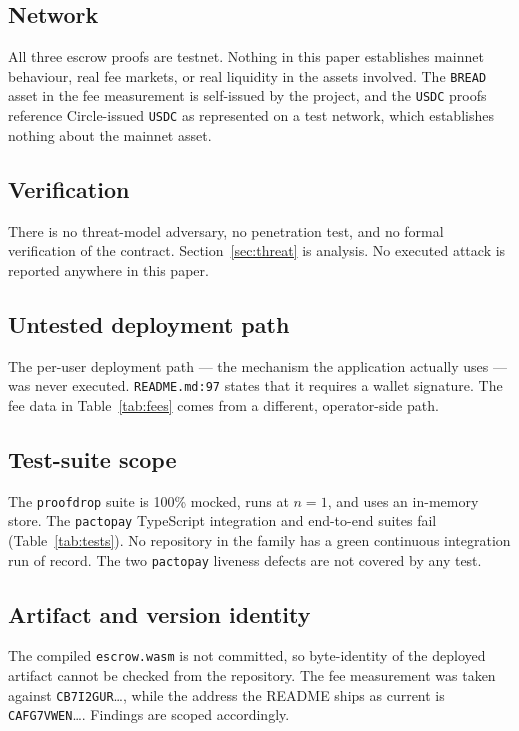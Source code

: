 \documentclass[sigconf,review]{acmart}
\begin{document}
\subsection{Network}
All three escrow proofs are testnet. Nothing in this paper establishes mainnet
behaviour, real fee markets, or real liquidity in the assets involved. The
\texttt{BREAD} asset in the fee measurement is self-issued by the project, and
the \texttt{USDC} proofs reference Circle-issued \texttt{USDC} as represented on
a test network, which establishes nothing about the mainnet asset.

\subsection{Verification}
There is no threat-model adversary, no penetration test, and no formal
verification of the contract. Section~\ref{sec:threat} is analysis. No executed
attack is reported anywhere in this paper.

\subsection{Untested deployment path}
The per-user deployment path --- the mechanism the application actually uses ---
was never executed. \texttt{README.md:97} states that it requires a wallet
signature. The fee data in Table~\ref{tab:fees} comes from a different,
operator-side path.

\subsection{Test-suite scope}
The \texttt{proofdrop} suite is 100\% mocked, runs at $n=1$, and uses an
in-memory store. The \texttt{pactopay} TypeScript integration and end-to-end
suites fail (Table~\ref{tab:tests}). No repository in the family has a green
continuous integration run of record. The two \texttt{pactopay} liveness
defects are not covered by any test.

\subsection{Artifact and version identity}
The compiled \texttt{escrow.wasm} is not committed, so byte-identity of the
deployed artifact cannot be checked from the repository. The fee measurement was
taken against \texttt{CB7I2GUR}\dots, while the address the README ships as
current is \texttt{CAFG7VWEN}\dots. Findings are scoped accordingly.
\end{document}
